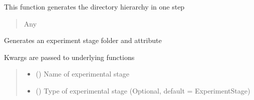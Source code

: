 \documentclass[letterpaper,10pt,english]{sphinxmanual}
\begin{document}
\begin{fulllineitems}

\begin{fulllineitems}
\label{\detokenize{ExperimentHierarchy:ExperimentHierarchy.ExperimentData.create}}
\pysigstartsignatures
{}
\pysigstopsignatures
\sphinxAtStartPar
This function generates the directory hierarchy in one step
\begin{quote}\begin{description}
\sphinxAtStartPar
Any

\end{description}\end{quote}

\end{fulllineitems}


\begin{fulllineitems}
\label{\detokenize{ExperimentHierarchy:ExperimentHierarchy.ExperimentData.create_experimental_stage}}
\pysigstartsignatures
{}
\pysigstopsignatures
\sphinxAtStartPar
Generates an experiment stage folder and attribute

\sphinxAtStartPar
Kwargs are passed to underlying functions
\begin{quote}\begin{description}
\begin{itemize}
\item {} 
\sphinxAtStartPar
{} () \textendash{} Name of experimental stage

\item {} 
\sphinxAtStartPar
{} (\sphinxstyleliteralemphasis{\sphinxupquote{{[}}}\sphinxstyleliteralemphasis{\sphinxupquote{, }}\sphinxstyleliteralemphasis{\sphinxupquote{{]}}}) \textendash{} Type of experimental stage (Optional, default = ExperimentStage)


\end{itemize}
\end{description}
\end{quote}
\end{fulllineitems}
\end{fulllineitems}
\end{document}
